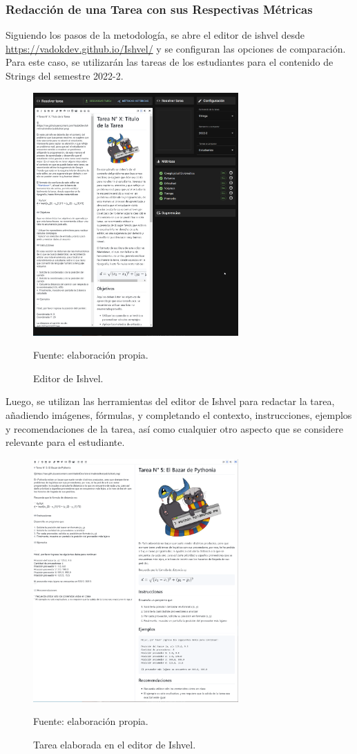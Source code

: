 \documentclass[letterpaper,12pt]{article}
\begin{document}
\subsubsection{Redacción de una Tarea con sus Respectivas Métricas}
Siguiendo los pasos de la metodología, se abre el editor de ishvel desde \url{https://vadokdev.github.io/Ishvel/} y se configuran las opciones de comparación. Para este caso, se utilizarán las tareas de los estudiantes para el contenido de Strings del semestre 2022-2.
\begin{figure}[H]
  \centering
  \includegraphics[width=0.7\textwidth]{figures/redact4.png}
  \caption{Editor de Ishvel.} Fuente: elaboración propia.
  \label{img:redact1}
\end{figure}
Luego, se utilizan las herramientas del editor de Ishvel para redactar la tarea, añadiendo imágenes, fórmulas, y completando el contexto, instrucciones, ejemplos y recomendaciones de la tarea, así como cualquier otro aspecto que se considere relevante para el estudiante.
\begin{figure}[H]
  \centering
  \includegraphics[width=0.7\textwidth]{figures/redact2.png}
  \caption{Tarea elaborada en el editor de Ishvel.} Fuente: elaboración propia.
  \label{img:redact2}
\end{figure}
\end{document}

